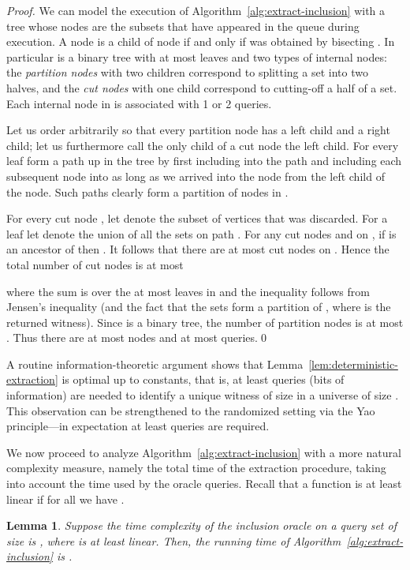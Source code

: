 \documentclass[11pt]{article}
\newtheorem{lemma}[theorem]{Lemma}
\begin{document}
\begin{proof}
We can model the execution of Algorithm~\ref{alg:extract-inclusion} with a 
tree  whose nodes are the subsets  that have appeared in the queue  during execution. A node  is a child of node  if and only if  was obtained by bisecting . In particular  is a binary tree with at most  leaves and two types of internal nodes: the {\em partition nodes} with two children correspond to splitting a set into two halves, and the {\em cut nodes} with one child correspond to cutting-off a half of a set. Each internal node in  is associated with 1 or 2 queries. 

Let us order  arbitrarily so that every partition node has a left child and a right child; let us furthermore call the only child of a cut node the left child. 
For every leaf  form a path  up in the tree by first including  into the path and including each subsequent node into  as long as we arrived into the node from the left child of the node. Such paths  clearly form a partition of nodes in .

For every cut node , let  denote the subset of vertices that was
discarded. For a leaf  let  denote the union of all the sets  
on path . For any cut nodes  and  on , if  is an ancestor 
of  then .
It follows that there are at most  cut nodes 
on . Hence the total number of cut nodes is at most 
 
where the sum is over the at most  leaves  in  and 
the inequality follows from Jensen's inequality (and the fact that 
the sets  form a partition of , where  is the 
returned witness). Since  is a binary tree, 
the number of partition nodes is at most . Thus there are 
at most  nodes and 
at most  queries.\qed
\end{proof}

A routine information-theoretic argument shows that 
Lemma~\ref{lem:deterministic-extraction} is optimal up to constants,
that is, at least  queries 
(bits of information) are needed to identify a unique witness of size  
in a universe of size . This observation can be strengthened to
the randomized setting via the Yao principle---in expectation at least  queries are required.

We now proceed to analyze Algorithm~\ref{alg:extract-inclusion} with a more natural complexity measure, namely the total time of the extraction procedure, taking into account the time used by the oracle queries. Recall that a function  is at least linear if for all  we have .

\begin{lemma}
\label{lem:deterministic-extract-runtime}
Suppose the time complexity of the inclusion oracle on a query set of size  
is , where  is at least linear.
Then, the running time of Algorithm~\ref{alg:extract-inclusion} 
is .
\end{lemma}
\end{document}
